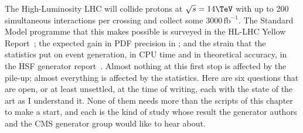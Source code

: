 The High-Luminosity LHC will collide protons at $\sqrt{s}=14\TeV$ with up to
200 simultaneous interactions per crossing and collect some
$3000\,\mathrm{fb}^{-1}$. The Standard Model programme that this makes
possible is surveyed in the HL-LHC Yellow Report~\cite{Azzi:2019yne}; the
expected gain in PDF precision in \cite{AbdulKhalek:2018rok}; and the strain
that the statistics put on event generation, in CPU time and in theoretical
accuracy, in the HSF generator report~\cite{HSFPhysicsEventGeneratorWG:2020gxw}.
Almost nothing at this first stop is affected by the pile-up; almost
everything is affected by the statistics. Here are six questions that are
open, or at least unsettled, at the time of writing, each with the state of
the art as I understand it. None of them needs more than the scripts of this
chapter to make a start, and each is the kind of study whose result the
generator authors and the CMS generator group would like to hear about.
